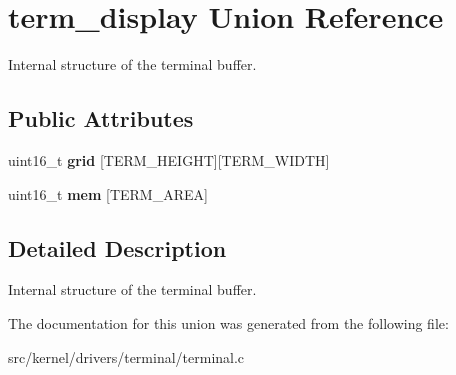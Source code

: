 \hypertarget{unionterm__display}{}\section{term\+\_\+display Union Reference}
\label{unionterm__display}


Internal structure of the terminal buffer.  


\subsection*{Public Attributes}
\begin{DoxyCompactItemize}
\item 
\mbox{\label{unionterm__display_a2e2f719a2a871152e864619bd074b66d}} 
uint16\+\_\+t {\bfseries grid} \mbox{[}T\+E\+R\+M\+\_\+\+H\+E\+I\+G\+HT\mbox{]}\mbox{[}T\+E\+R\+M\+\_\+\+W\+I\+D\+TH\mbox{]}
\item 
\mbox{\label{unionterm__display_a8b05f01d4c929297f189228dc199d5b5}} 
uint16\+\_\+t {\bfseries mem} \mbox{[}T\+E\+R\+M\+\_\+\+A\+R\+EA\mbox{]}
\end{DoxyCompactItemize}


\subsection{Detailed Description}
Internal structure of the terminal buffer. 

The documentation for this union was generated from the following file\+:\begin{DoxyCompactItemize}
\item 
src/kernel/drivers/terminal/terminal.\+c\end{DoxyCompactItemize}
